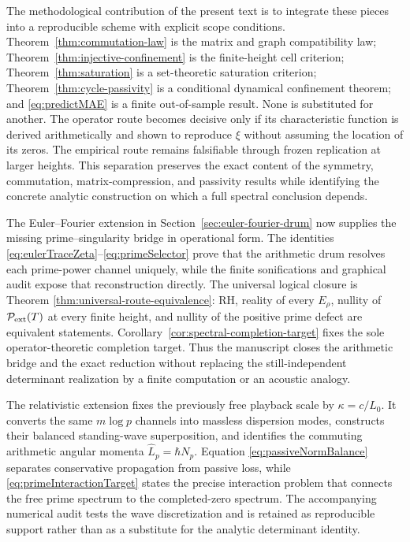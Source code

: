 \documentclass[11pt]{amsart}
\theoremstyle{definition}
\theoremstyle{remark}
\begin{document}
The methodological contribution of the present text is to integrate these pieces into a reproducible scheme with explicit scope conditions. Theorem~\ref{thm:commutation-law} is the matrix and graph compatibility law; Theorem~\ref{thm:injective-confinement} is the finite-height cell criterion; Theorem~\ref{thm:saturation} is a set-theoretic saturation criterion; Theorem~\ref{thm:cycle-passivity} is a conditional dynamical confinement theorem; and \eqref{eq:predictMAE} is a finite out-of-sample result.  None is substituted for another.  The operator route becomes decisive only if its characteristic function is derived arithmetically and shown to reproduce $\xi$ without assuming the location of its zeros.  The empirical route remains falsifiable through frozen replication at larger heights.  This separation preserves the exact content of the symmetry, commutation, matrix-compression, and passivity results while identifying the concrete analytic construction on which a full spectral conclusion depends.

The Euler--Fourier extension in Section~\ref{sec:euler-fourier-drum} now supplies the missing
prime--singularity bridge in operational form.  The identities
\eqref{eq:eulerTraceZeta}--\eqref{eq:primeSelector} prove that the arithmetic drum resolves
each prime-power channel uniquely, while the finite sonifications and graphical audit expose
that reconstruction directly.  The universal logical closure is Theorem
\ref{thm:universal-route-equivalence}: RH, reality of every $E_\rho$, nullity of
$\mathcal P_{\rm ext}(T)$ at every finite height, and nullity of the positive prime defect are
equivalent statements.  Corollary~\ref{cor:spectral-completion-target} fixes the sole
operator-theoretic completion target.  Thus the manuscript closes the arithmetic bridge and
the exact reduction without replacing the still-independent determinant realization by a
finite computation or an acoustic analogy.

The relativistic extension fixes the previously free playback scale by
$\kappa=c/L_0$.  It converts the same $m\log p$ channels into massless dispersion modes,
constructs their balanced standing-wave superposition, and identifies the commuting
arithmetic angular momenta $\widehat L_p=\hbar N_p$.  Equation
\eqref{eq:passiveNormBalance} separates conservative propagation from passive loss, while
\eqref{eq:primeInteractionTarget} states the precise interaction problem that connects the
free prime spectrum to the completed-zero spectrum.  The accompanying numerical audit tests
the wave discretization and is retained as reproducible support rather than as a substitute
for the analytic determinant identity.
\end{document}

